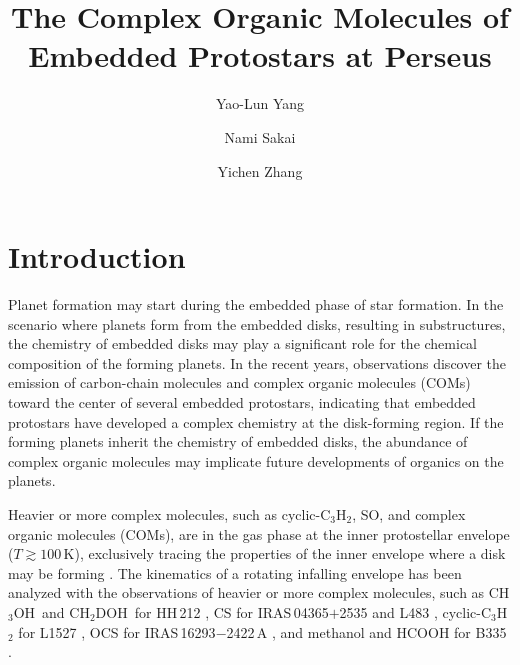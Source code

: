 \documentclass[twocolumn]{aastex62}
\newcommand{\methanol}{\mbox{CH$_{3}$OH}}
\newcommand{\dmethanol}{\mbox{CH$_{2}$DOH}}
\begin{document}
\title{The Complex Organic Molecules of Embedded Protostars at Perseus}

\author{Yao-Lun Yang}
\author{Nami Sakai}
\author{Yichen Zhang}


\keywords{}

\section{Introduction}


Planet formation may start during the embedded phase of star formation.  In the scenario where planets form from the embedded disks, resulting in substructures, the chemistry of embedded disks may play a significant role for the chemical composition of the forming planets.  In the recent years, observations discover the emission of carbon-chain molecules and complex organic molecules (COMs) toward the center of several embedded protostars, indicating that embedded protostars have developed a complex chemistry at the disk-forming region.  If the forming planets inherit the chemistry of embedded disks, the abundance of complex organic molecules may implicate future developments of organics on the planets. 

Heavier or more complex molecules, such as cyclic-C$_{3}$H$_{2}$, SO, and complex organic molecules (COMs), are in the gas phase at the inner protostellar envelope ($T\gtrsim100$\,K), exclusively tracing the properties of the inner envelope where a disk may be forming \citep{2013ChRv..113.8961A,2014Natur.507...78S}.  The kinematics of a rotating infalling envelope has been analyzed with the observations of heavier or more complex molecules, such as \methanol\ and \dmethanol\ for HH\,212 \citep{2017ApJ...843...27L}, CS for IRAS\,04365$+$2535 \citep{2016ApJ...820L..34S} and L483 \citep{2017ApJ...837..174O}, cyclic-C$_{3}$H$_{2}$ for L1527 \citep{2014Natur.507...78S}, OCS for IRAS\,16293$-$2422\,A \citep{2016ApJ...824...88O}, and methanol and HCOOH for B335 \citep{2019ApJ...873L..21I}.
\end{document}
